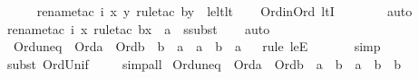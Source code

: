 \begin{isabellebody}
\ \ \ \ \isamarkupfalse%
{\isacharparenleft}{\kern0pt}rename{\isacharunderscore}{\kern0pt}tac\ i\ x\ y{\isacharcomma}{\kern0pt}\ rule{\isacharunderscore}{\kern0pt}tac\ b{\isacharequal}{\kern0pt}y\ \ le{\isacharunderscore}{\kern0pt}lt{\isacharunderscore}{\kern0pt}lt{\isacharparenright}{\kern0pt}\isanewline
\ \ \isamarkupfalse%
\ Ord{\isacharunderscore}{\kern0pt}in{\isacharunderscore}{\kern0pt}Ord\ ltI\ \isanewline
\ \ \ \ \ \isamarkupfalse%
\ auto{\isacharbrackleft}{\kern0pt}{}{\isacharbrackright}{\kern0pt}\isanewline
\ \ \ \isamarkupfalse%
{\isacharparenleft}{\kern0pt}rename{\isacharunderscore}{\kern0pt}tac\ i\ x{\isacharcomma}{\kern0pt}\ rule{\isacharunderscore}{\kern0pt}tac\ b{\isacharequal}{\kern0pt}x\ \ a{\isacharequal}{\kern0pt}{}\ \ ssubst{\isacharparenright}{\kern0pt}\isanewline
\ \ \isamarkupfalse%
\ auto%
\endisatagproof
{\isafoldproof}%
%
\isadelimproof
\isanewline
%
\endisadelimproof
\isanewline
{}\isamarkupfalse%
\ Ord{\isacharunderscore}{\kern0pt}un{\isacharunderscore}{\kern0pt}eq{}\ {\isacharcolon}{\kern0pt}\ {\isachardoublequoteopen}Ord{\isacharparenleft}{\kern0pt}a{\isacharparenright}{\kern0pt}\ {\isasymLongrightarrow}\ Ord{\isacharparenleft}{\kern0pt}b{\isacharparenright}{\kern0pt}\ {\isasymLongrightarrow}\ b\ {\isasymle}\ a\ {\isasymLongrightarrow}\ a\ {\isasymunion}\ b\ {\isacharequal}{\kern0pt}\ a{\isachardoublequoteclose}\isanewline
%
\isadelimproof
\ \ %
\endisadelimproof
%
\isatagproof
{}\isamarkupfalse%
{\isacharparenleft}{\kern0pt}rule\ leE{\isacharparenright}{\kern0pt}\ \isanewline
\ \ \ \ \isamarkupfalse%
\ simp\isanewline
\ \ \ \isamarkupfalse%
{\isacharparenleft}{\kern0pt}subst\ Ord{\isacharunderscore}{\kern0pt}Un{\isacharunderscore}{\kern0pt}if{\isacharparenright}{\kern0pt}\ \isanewline
\ \ \isamarkupfalse%
\ simp{\isacharunderscore}{\kern0pt}all%
\endisatagproof
{\isafoldproof}%
%
\isadelimproof
\isanewline
%
\endisadelimproof
\isanewline
{}\isamarkupfalse%
\ Ord{\isacharunderscore}{\kern0pt}un{\isacharunderscore}{\kern0pt}eq{}\ {\isacharcolon}{\kern0pt}\ {\isachardoublequoteopen}Ord{\isacharparenleft}{\kern0pt}a{\isacharparenright}{\kern0pt}\ {\isasymLongrightarrow}\ Ord{\isacharparenleft}{\kern0pt}b{\isacharparenright}{\kern0pt}\ {\isasymLongrightarrow}\ a\ {\isasymle}\ b\ {\isasymLongrightarrow}\ a\ {\isasymunion}\ b\ {\isacharequal}{\kern0pt}\ b{\isachardoublequoteclose}\isanewline

\end{isabellebody}
